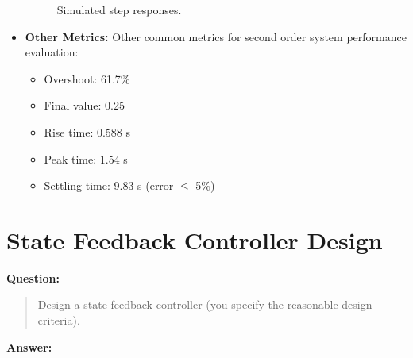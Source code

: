 \documentclass[12pt, oneside]{article}
\begin{document}
\begin{itemize}
        \begin{figure}[htbp]
          \centering
          \quad %
          \caption{Simulated step responses.}
        \end{figure}

    \item \textbf{Other Metrics:}  Other common metrics for second order system performance evaluation:
        \begin{itemize}
            \item Overshoot: 61.7\%
            \item Final value: 0.25
            \item Rise time: 0.588 s
            \item Peak time: 1.54 s
            \item Settling time: 9.83 s (error $\leq$ 5\%)
        \end{itemize}
\end{itemize}



\section{State Feedback Controller Design}
\textbf{Question:}
\begin{quote}
Design a state feedback controller (you specify the reasonable design criteria).
\end{quote}
\textbf{Answer:}
\end{document}
